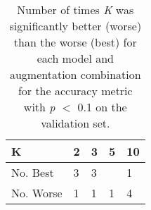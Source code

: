 \documentclass[11pt,a4paper]{article}
\begin{document}
\begin{table}[]
\begin{tabular}{|l|l|l|l|l|}
\hline
K & 2 & 3 & 5 & 10 \\ \hline
No. Best & 3 & 3 &  & 1 \\ \hline
No. Worse & 1 & 1 & 1 & 4 \\ \hline
\end{tabular}
\caption{Number of times \textit{K} was significantly better (worse) than the worse (best) for each model and augmentation combination for the accuracy metric with \textit{p} $<$ 0.1 on the validation set.}
\end{table}
\end{document}
